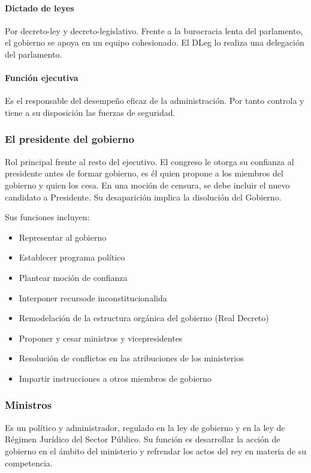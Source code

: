         \paragraph{Dictado de leyes}
            Por decreto-ley y decreto-legislativo. Frente a la burocracia lenta del parlamento, el gobierno se apoya en un equipo cohesionado. El DLeg lo realiza una delegación del parlamento.

        \paragraph{Función ejecutiva}
            Es el responsable del desempeño eficaz de la administración. Por tanto controla y tiene a su disposición las fuerzas de seguridad.

    \subsubsection{El presidente del gobierno}
        Rol principal frente al resto del ejecutivo. El congreso le otorga su confianza al presidente antes de formar gobierno, es él quien propone a los miembros del gobierno y quien los cesa. En una moción de censura, se debe incluir el nuevo candidato a Presidente. Su desaparición implica la disolución del Gobierno.

        Sus funciones incluyen:
        \begin{itemize}
            \item Representar al gobierno
            \item Establecer programa político
            \item Plantear moción de confianza
            \item Interponer recursode inconstitucionalida
            \item Remodelación de la estructura orgánica del gobierno (Real Decreto)
            \item Proponer y cesar ministros y vicepresidentes
            \item Resolución de conflictos en las atribuciones de los ministerios
            \item Impartir instrucciones a otros miembros de gobierno
        \end{itemize}
    \subsubsection{Ministros}
        Es un político y administrador, regulado en la ley de gobierno y en la ley de Régimen Jurídico del Sector Público. Su función es desarrollar la acción de gobierno en el ámbito del ministerio y refrendar los actos del rey en materia de su competencia.

